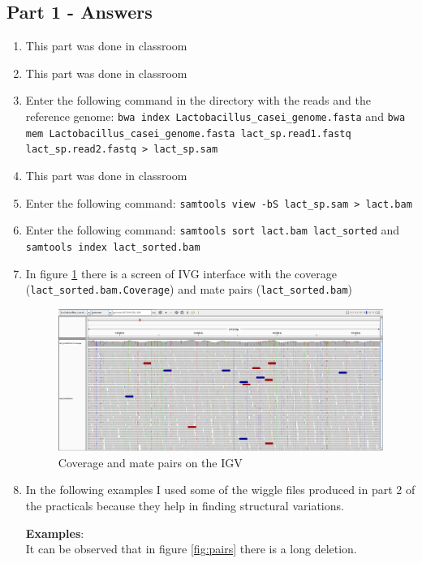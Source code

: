\subsection{Part 1 - Answers}
\begin{enumerate}
  \item This part was done in classroom
  \item This part was done in classroom
  \item Enter the following command in the directory with the reads and the
reference genome: \texttt{bwa index Lactobacillus\_casei\_genome.fasta} and
\texttt{bwa mem Lactobacillus\_casei\_genome.fasta lact\_sp.read1.fastq 
lact\_sp.read2.fastq > lact\_sp.sam}
  \item This part was done in classroom
  \item Enter the following command:
\texttt{samtools view -bS lact\_sp.sam > lact.bam}
  \item Enter the following command:
\texttt{samtools sort lact.bam lact\_sorted} and
\texttt{samtools index lact\_sorted.bam}
  \item In figure \ref{fig:coverage_matepairs} there is a screen of IVG
interface with the coverage (\texttt{lact\_sorted.bam.Coverage}) and mate pairs
(\texttt{lact\_sorted.bam})

\begin{figure}[h]
  \centering
  \includegraphics[scale=0.2]{img/coverage_matepairs}
  \caption{Coverage and mate pairs on the IGV}
  \label{fig:coverage_matepairs}
\end{figure}

  \item In the following examples I used some of the wiggle files produced in
part 2 of the practicals because they help in finding structural variations.

\textbf{Examples}: \\

It can be observed that in figure \ref{fig:pairs} there is
a long deletion.


\end{enumerate}
